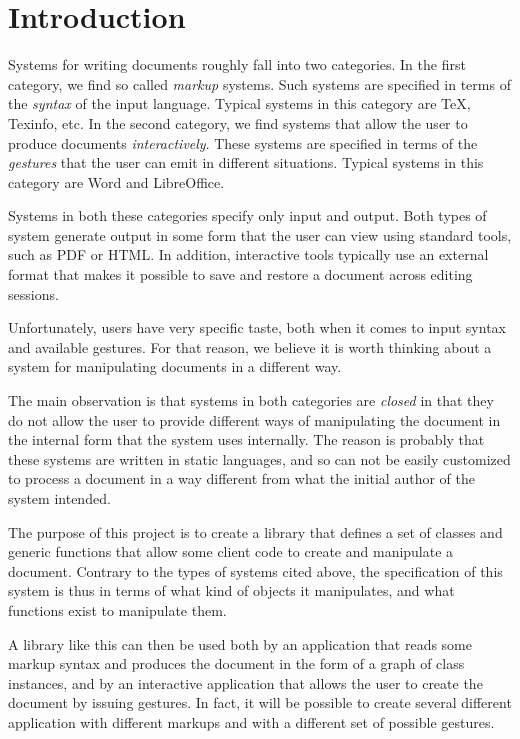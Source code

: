 \chapter{Introduction}
\setcounter{page}{1}%
%
\label{chap-introduction}%

Systems for writing documents roughly fall into two categories.  In
the first category, we find so called \emph{markup} systems.  Such
systems are specified in terms of the \emph{syntax} of the input
language.  Typical systems in this category are TeX, Texinfo, etc.  In
the second category, we find systems that allow the user to produce
documents \emph{interactively}.  These systems are specified in terms
of the \emph{gestures} that the user can emit in different situations.
Typical systems in this category are Word and LibreOffice.

Systems in both these categories specify only input and output.  Both
types of system generate output in some form that the user can view
using standard tools, such as PDF or HTML.  In addition, interactive
tools typically use an external format that makes it possible to save
and restore a document across editing sessions.

Unfortunately, users have very specific taste, both when it comes to
input syntax and available gestures.  For that reason, we believe it
is worth thinking about a system for manipulating documents in a
different way.

The main observation is that systems in both categories are
\emph{closed} in that they do not allow the user to provide different
ways of manipulating the document in the internal form that the system
uses internally.  The reason is probably that these systems are
written in static languages, and so can not be easily customized to
process a document in a way different from what the initial author of
the system intended.

The purpose of this project is to create a library that defines a set
of classes and generic functions that allow some client code to create
and manipulate a document.  Contrary to the types of systems cited
above, the specification of this system is thus in terms of what kind
of objects it manipulates, and what functions exist to manipulate
them.

A library like this can then be used both by an application that reads
some markup syntax and produces the document in the form of a graph of
class instances, and by an interactive application that allows the
user to create the document by issuing gestures.  In fact, it will be
possible to create several different application with different
markups and with a different set of possible gestures.

